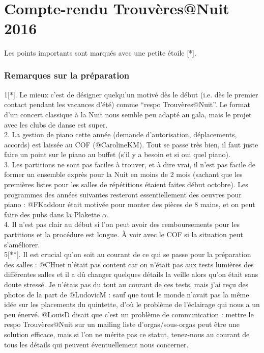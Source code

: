 \documentclass[a4paper,11pt]{article}
\begin{document}
{
\selectfont

~\\

\part*{Compte-rendu Trouvères@Nuit 2016}
Les points importants sont marqués avec une petite étoile [*].

\section{Remarques sur la préparation}
1[*]. Le mieux c'est de désigner quelqu'un motivé dès le début (i.e. dès le premier contact pendant les vacances d'été) comme ``respo Trouvères@Nuit''. Le format d'un concert classique à la Nuit nous semble peu adapté au gala, mais le projet avec les clubs de danse est super.\\
2. La gestion de piano cette année (demande d'autorisation, déplacements, accords) est laissée au COF (@CarolineKM). Tout se passe très bien, il faut juste faire un point sur le piano au buffet (s'il y a besoin et si oui quel piano).\\
3. Les partitions ne sont pas faciles à trouver, et à dire vrai, il n'est pas facile de former un ensemble exprès pour la Nuit en moins de 2 mois (sachant que les premières listes pour les salles de répétitions étaient faites début octobre). Les programmes des années suivantes resteront essentiellement des oeuvres pour piano : @FKaddour était motivée pour monter des pièces de 8 mains, et on peut faire des pubs dans la Plakette $\alpha$.\\
4. Il n'est pas clair au début si l'on peut avoir des remboursements pour les partitions et la procédure est longue. À voir avec le COF si la situation peut s'améliorer.\\
5[**]. Il est crucial qu'on soit au courant de ce qui se passe pour la préparation des salles : @CHuet n'était pas content car on n'était pas aux tests lumières des différentes salles et il a dû changer quelques détails la veille alors qu'on était sans doute stressé. Je n'étais pas du tout au courant de ces tests, mais j'ai reçu des photos de la part de @LudovicM : sauf que tout le monde n'avait pas la même idée sur les placements du quintette, d'où le problème de l'éclairage qui nous a un peu énervé. @LouisD disait que c'est un problème de communication : mettre le respo Trouvères@Nuit sur un mailing liste d'orgas/sous-orgas peut être une solution efficace, mais si l'on ne mérite pas ce statut, tenez-nous au courant de tous les détails qui peuvent éventuellement nous concerner.\\
}
\end{document}
